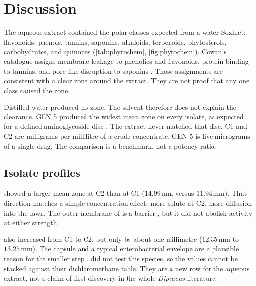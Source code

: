 
\chapter{Discussion}\label{ch:discussion}

The aqueous extract contained the polar classes expected from a water Soxhlet: flavonoids, phenols, tannins, saponins, alkaloids, terpenoids, phytosterols, carbohydrates, and quinones (\cref{tab:phytochem}, \cref{fig:phytochem}). Cowan's catalogue assigns membrane leakage to phenolics and flavonoids, protein binding to tannins, and pore-like disruption to saponins \citep{cowan1999plant,jubair2021review}. Those assignments are consistent with a clear zone around the extract. They are not proof that any one class caused the zone.

Distilled water produced no zone. The solvent therefore does not explain the clearance. GEN 5 produced the widest mean zone on every isolate, as expected for a defined aminoglycoside disc \citep{clsi2024m100}. The extract never matched that disc. C1 and C2 are milligrams per millilitre of a crude concentrate. GEN 5 is five micrograms of a single drug. The comparison is a benchmark, not a potency ratio.

\section{Isolate profiles}

 showed a larger mean zone at C2 than at C1 ($14.99$\,mm versus $11.94$\,mm). That direction matches a simple concentration effect: more solute at C2, more diffusion into the lawn. The outer membrane of  is a barrier \citep{nikaido2003molecular,pages2008porin}, but it did not abolish activity at either strength.

 also increased from C1 to C2, but only by about one millimetre ($12.35$\,mm to $13.25$\,mm). The capsule and a typical enterobacterial envelope are a plausible reason for the smaller step \citep{who2024bacterial}. \citet{drakhshaan2026identification} did not test this species, so the values cannot be stacked against their dichloromethane table. They are a new row for the aqueous extract, not a claim of first discovery in the whole \textit{Dipsacus} literature.

